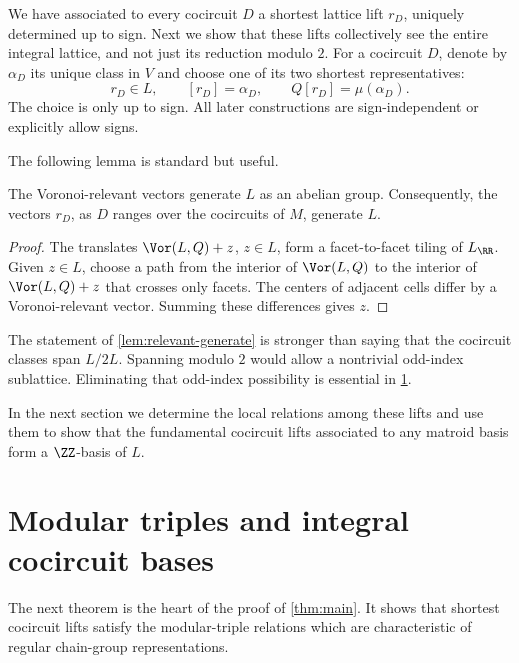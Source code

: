 \documentclass[11pt,letterpaper]{amsart}
\begin{document}
We have associated to every cocircuit $D$ a shortest
lattice lift $r_D$, uniquely determined up to sign. Next we show that these lifts collectively see the entire integral lattice, and not just its reduction modulo $2$. For a cocircuit $D$, denote by $\alpha_D$ its unique class in $V$ and choose one of its two shortest representatives:
\begin{equation}\label{eq:rD}
  r_D\in L,
  \qquad [r_D]=\alpha_D,
  \qquad Q[r_D]=\mu(\alpha_D).
\end{equation}
The choice is only up to sign.  All later constructions are sign-independent or explicitly allow signs.

The following lemma is standard but useful. 

\begin{lemma}\label{lem:relevant-generate}
The Voronoi-relevant vectors generate $L$ as an abelian group.  Consequently, the vectors $r_D$, as $D$ ranges over the cocircuits of $M$, generate $L$.
\end{lemma}

\begin{proof}
The translates $\Vor(L,Q)+z$, $z\in L$, form a facet-to-facet tiling of $L_{\RR}$.  Given $z\in L$, choose a path from the interior of $\Vor(L,Q)$ to the interior of $\Vor(L,Q)+z$ that crosses only facets. The centers of adjacent cells differ by a Voronoi-relevant vector.  Summing these differences gives $z$.
\end{proof}

\begin{remark}
    The statement of \cref{lem:relevant-generate} is stronger than saying that the cocircuit classes span $L/2L$.  Spanning modulo $2$ would allow a nontrivial odd-index sublattice.  Eliminating that odd-index possibility is essential in \cref{sec:modulartriples}.
\end{remark}

In the next section we determine the local relations among these lifts and use them to show that the fundamental cocircuit lifts associated to any matroid basis form a $\ZZ$-basis of $L$.

\section{Modular triples and integral cocircuit bases}\label{sec:modulartriples}

The next theorem is the heart of the proof of \cref{thm:main}. It shows that shortest cocircuit lifts satisfy the modular-triple relations which are characteristic of regular chain-group representations.
\end{document}
